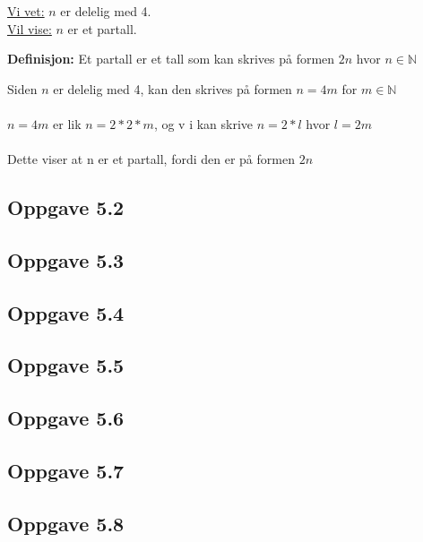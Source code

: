 \documentclass{article}
\begin{document}
\underline{Vi vet:} $n$ er delelig med 4.\\
\underline{Vil vise:} $n$ er et partall.

\textbf{Definisjon:} Et partall er et tall som kan skrives på formen $2n$ hvor $n \in \mathbb{N}$

Siden $n$ er delelig med 4, kan den skrives på formen $n = 4m$ for $m \in  \mathbb{N}$ \\\\
$n = 4m$ er lik $n =2 * 2 * m$, og v i kan skrive $n = 2 * l$ hvor $l = 2m$
\\\\
Dette viser at n er et partall, fordi den er på formen $2n$

\subsection*{Oppgave 5.2}


\subsection*{Oppgave 5.3}


\subsection*{Oppgave 5.4}


\subsection*{Oppgave 5.5}


\subsection*{Oppgave 5.6}


\subsection*{Oppgave 5.7}


\subsection*{Oppgave 5.8}
\end{document}
